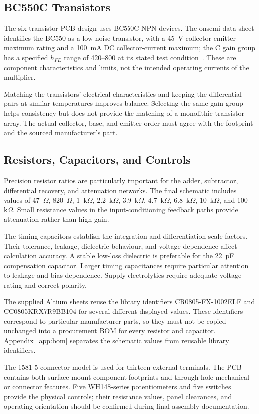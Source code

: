 \documentclass[11pt,a4paper]{article}
\newcommand{\ohm}{\ensuremath{\Omega}}
\newcommand{\kohm}{\ensuremath{\mathrm{k}\Omega}}
\begin{document}
\subsection{BC550C Transistors}
The six-transistor PCB design uses BC550C NPN devices. The onsemi data sheet identifies the BC550 as a low-noise transistor, with a 45~V collector-emitter maximum rating and a 100~mA DC collector-current maximum; the C gain group has a specified $h_{FE}$ range of 420--800 at its stated test condition~\cite{bc550}. These are component characteristics and limits, not the intended operating currents of the multiplier.

Matching the transistors' electrical characteristics and keeping the differential pairs at similar temperatures improves balance. Selecting the same gain group helps consistency but does not provide the matching of a monolithic transistor array. The actual collector, base, and emitter order must agree with the footprint and the sourced manufacturer's part.

\subsection{Resistors, Capacitors, and Controls}
Precision resistor ratios are particularly important for the adder, subtractor, differential recovery, and attenuation networks. The final schematic includes values of 47~\ohm, 820~\ohm, 1~\kohm, 2.2~\kohm, 3.9~\kohm, 4.7~\kohm, 6.8~\kohm, 10~\kohm, and 100~\kohm. Small resistance values in the input-conditioning feedback paths provide attenuation rather than high gain.

The timing capacitors establish the integration and differentiation scale factors. Their tolerance, leakage, dielectric behaviour, and voltage dependence affect calculation accuracy. A stable low-loss dielectric is preferable for the 22~pF compensation capacitor. Larger timing capacitances require particular attention to leakage and bias dependence. Supply electrolytics require adequate voltage rating and correct polarity.

The supplied Altium sheets reuse the library identifiers CR0805-FX-1002ELF and CC0805KRX7R9BB104 for several different displayed values. These identifiers correspond to particular manufacturer parts, so they must not be copied unchanged into a procurement BOM for every resistor and capacitor. Appendix~\ref{app:bom} separates the schematic values from reusable library identifiers.

The 1581-5 connector model is used for thirteen external terminals. The PCB contains both surface-mount component footprints and through-hole mechanical or connector features. Five WH148-series potentiometers and five switches provide the physical controls; their resistance values, panel clearances, and operating orientation should be confirmed during final assembly documentation.
\end{document}
